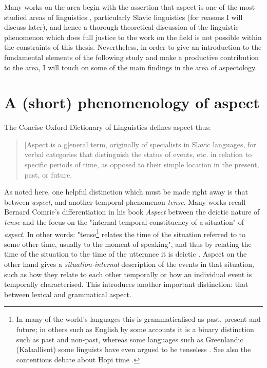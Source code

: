 Many works on the area begin with the assertion that aspect is one of the most studied areas of linguistics \citep{Sasse2002RecentAI}, particularly Slavic linguistics (for reasons I will discuss later), and hence a thorough theoretical discussion of the linguistic phenomenon which does full justice to the work on the field is not possible within the constraints of this thesis. Nevertheless, in order to give an introduction to the fundamental elements of the following study and make a productive contribution to the area, I will touch on some of the main findings in the area of aspectology.
\section{A (short) phenomenology of aspect}
The Concise Oxford Dictionary of Linguistics \citep{matthews2014concise} defines aspect thus: 

\begin{quotation}
    [Aspect is a g]eneral term, originally of specialists in Slavic languages, for verbal categories that distinguish the status of events, etc. in relation to specific periods of time, as opposed to their simple location in the present, past, or future.
\end{quotation}

As noted here, one helpful distinction which must be made right away is that between \emph{aspect}, and another temporal phenomenon \emph{tense}. Many works recall Bernard Comrie's differentiation in his book \emph{Aspect} \citep{comrie1976aspect} between the deictic nature of \emph{tense} and the focus on the "internal temporal constituency of a situation" of \emph{aspect}. In other words: "tense\footnote{In many of the world's languages this is grammaticalised as past, present and future; in others such as English by some accounts \citep{jespersen2013essentials} it is a binary distinction such as past and non-past, whereas some languages such as Greenlandic (Kalaallisut) some linguists have even argued to be tenseless \citet{10.1093/jos/ffh029}. See also the contentious debate about Hopi time \citet{whorf-writings, hopitime}. } relates the time of the situation referred to to some other time, usually to the moment of speaking", and thus by relating the time of the situation to the time of the utterance it is deictic \citep{comrie1976aspect}. Aspect on the other hand gives a \emph{situation-internal} description of the events in that situation, such as how they relate to each other temporally or how an individual event is temporally characterised. This introduces another important distinction: that between lexical and grammatical aspect.

